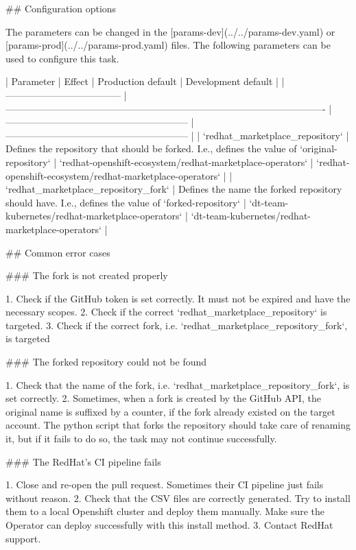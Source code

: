 ## Configuration options

The parameters can be changed in the [params-dev](../../params-dev.yaml) or [params-prod](../../params-prod.yaml) files.
The following parameters can be used to configure this task.

| Parameter                            | Effect                                                                                               | Production default                                        | Development default                                       |
| ------------------------------------ | ---------------------------------------------------------------------------------------------------- | --------------------------------------------------------- | --------------------------------------------------------- |
| `redhat_marketplace_repository`      | Defines the repository that should be forked. I.e., defines the value of `{original-repository}`     | `redhat-openshift-ecosystem/redhat-marketplace-operators` | `redhat-openshift-ecosystem/redhat-marketplace-operators` |
| `redhat_marketplace_repository_fork` | Defines the name the forked repository should have. I.e., defines the value of `{forked-repository}` | `dt-team-kubernetes/redhat-marketplace-operators`         | `dt-team-kubernetes/redhat-marketplace-operators`         |

## Common error cases

### The fork is not created properly

1. Check if the GitHub token is set correctly. It must not be expired and have the necessary scopes.
2. Check if the correct `redhat_marketplace_repository` is targeted.
3. Check if the correct fork, i.e. `redhat_marketplace_repository_fork`, is targeted

### The forked repository could not be found

1. Check that the name of the fork, i.e. `redhat_marketplace_repository_fork`, is set correctly.
2. Sometimes, when a fork is created by the GitHub API, the original name is suffixed by a counter, if the fork already existed on the target account.
   The python script that forks the repository should take care of renaming it, but if it fails to do so, the task may not continue successfully.

### The RedHat's CI pipeline fails

1. Close and re-open the pull request. 
   Sometimes their CI pipeline just fails without reason.
2. Check that the CSV files are correctly generated.
   Try to install them to a local Openshift cluster and deploy them manually.
   Make sure the Operator can deploy successfully with this install method.
3. Contact RedHat support.
